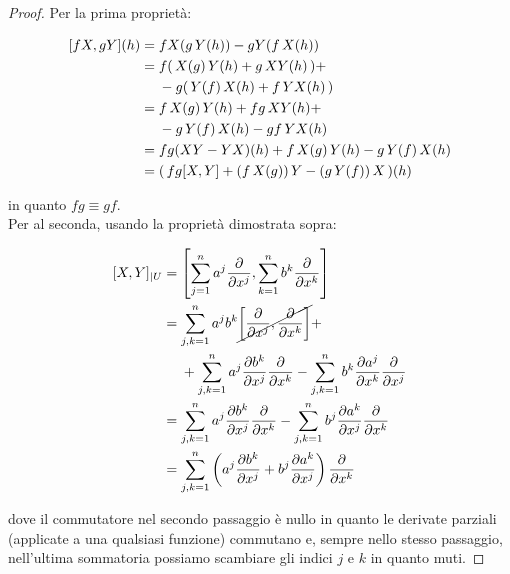 \begin{proof}
	Per la prima proprietà:
	
	\begin{align}
		\begin{split}
			[f X, g Y](h) &= f X(g \, Y(h)) - g Y(f \, X(h))\\
			&= f ( \, X(g) \, Y(h) + g \, XY(h) \, ) + \\
			& \hspace{13px} - g ( \, Y(f) \, X(h) + f \, YX(h) \, )\\
			&= f \, X(g) \, Y(h) + f g \, XY(h) + \\
			& \hspace{13px} - g \, Y(f) \, X(h) - g f \, YX(h)\\
			&= f g (XY-YX)(h) + f \, X(g) \, Y(h) - g \, Y(f) \, X(h)\\
			&= ( \, f g [X,Y] + (f \, X(g)) \, Y - (g \, Y(f)) \, X \, )(h)
		\end{split}
	\end{align}

	in quanto $ fg \equiv gf $.\\
	Per al seconda, usando la proprietà dimostrata sopra:
	
	\begin{align}
		\begin{split}
			[X,Y]_{|U} &= \left[ \sum_{j=1}^{n} a^{j} \dfrac{\partial}{\partial x^{j}} , \sum_{k=1}^{n} b^{k} \dfrac{\partial}{\partial x^{k}} \right]\\
			&= \sum_{j,k=1}^{n} a^{j} b^{k} \cancel{\left[ \dfrac{\partial}{\partial x^{j}} , \dfrac{\partial}{\partial x^{k}} \right]} + \\
			& \hspace{13px} + \sum_{j,k=1}^{n} a^{j} \dfrac{\partial b^{k}}{\partial x^{j}} \dfrac{\partial}{\partial x^{k}} - \sum_{j,k=1}^{n} b^{k} \dfrac{\partial a^{j}}{\partial x^{k}} \dfrac{\partial}{\partial x^{j}}\\
			&= \sum_{j,k=1}^{n} a^{j} \dfrac{\partial b^{k}}{\partial x^{j}} \dfrac{\partial}{\partial x^{k}} - \sum_{j,k=1}^{n} b^{j} \dfrac{\partial a^{k}}{\partial x^{j}} \dfrac{\partial}{\partial x^{k}}\\
			&= \sum_{j,k=1}^{n} \left( a^{j} \dfrac{\partial b^{k}}{\partial x^{j}} + b^{j} \dfrac{\partial a^{k}}{\partial x^{j}} \right) \dfrac{\partial}{\partial x^{k}}
		\end{split}
	\end{align}

	dove il commutatore nel secondo passaggio è nullo in quanto le derivate parziali (applicate a una qualsiasi funzione) commutano e, sempre nello stesso passaggio, nell'ultima sommatoria possiamo scambiare gli indici $ j $ e $ k $ in quanto muti.
\end{proof}


